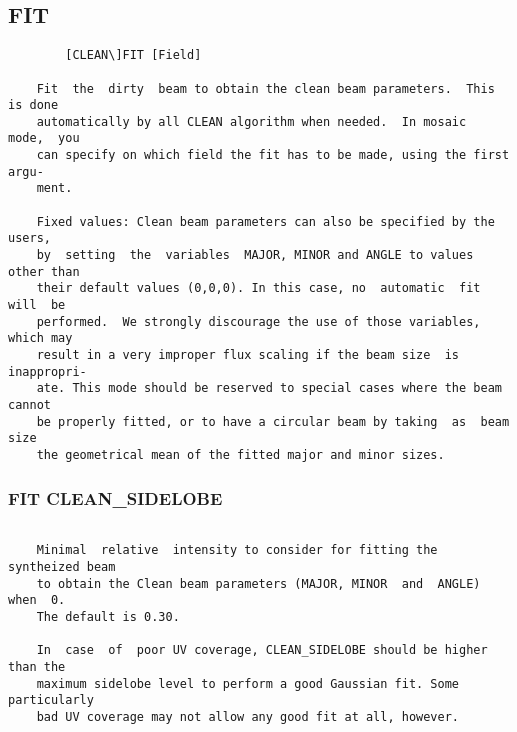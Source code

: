 \subsection{FIT}
\begin{verbatim}
        [CLEAN\]FIT [Field]

    Fit  the  dirty  beam to obtain the clean beam parameters.  This is done
    automatically by all CLEAN algorithm when needed.  In mosaic  mode,  you
    can specify on which field the fit has to be made, using the first argu-
    ment.

    Fixed values: Clean beam parameters can also be specified by the  users,
    by  setting  the  variables  MAJOR, MINOR and ANGLE to values other than
    their default values (0,0,0). In this case, no  automatic  fit  will  be
    performed.  We strongly discourage the use of those variables, which may
    result in a very improper flux scaling if the beam size  is  inappropri-
    ate. This mode should be reserved to special cases where the beam cannot
    be properly fitted, or to have a circular beam by taking  as  beam  size
    the geometrical mean of the fitted major and minor sizes.

\end{verbatim}
\subsubsection{FIT CLEAN\_SIDELOBE}
\begin{verbatim}

    Minimal  relative  intensity to consider for fitting the syntheized beam
    to obtain the Clean beam parameters (MAJOR, MINOR  and  ANGLE)  when  0.
    The default is 0.30.

    In  case  of  poor UV coverage, CLEAN_SIDELOBE should be higher than the
    maximum sidelobe level to perform a good Gaussian fit. Some particularly
    bad UV coverage may not allow any good fit at all, however.

\end{verbatim}
